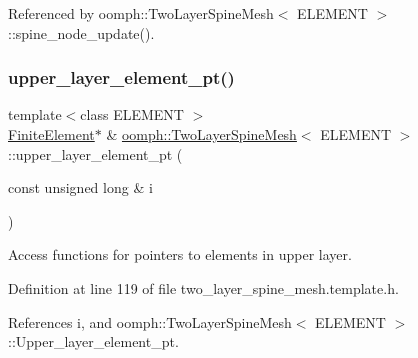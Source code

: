 Referenced by oomph\+::\+Two\+Layer\+Spine\+Mesh$<$ E\+L\+E\+M\+E\+N\+T $>$\+::spine\+\_\+node\+\_\+update().

\mbox{\label{classoomph_1_1TwoLayerSpineMesh_a36680574d0c8f023206ce8ffe1a99b06}} 
\subsubsection{\texorpdfstring{upper\+\_\+layer\+\_\+element\+\_\+pt()}{upper\_layer\_element\_pt()}}
{\footnotesize\ttfamily template$<$class E\+L\+E\+M\+E\+NT $>$ \\
\hyperlink{classoomph_1_1FiniteElement}{Finite\+Element}$\ast$ \& \hyperlink{classoomph_1_1TwoLayerSpineMesh}{oomph\+::\+Two\+Layer\+Spine\+Mesh}$<$ E\+L\+E\+M\+E\+NT $>$\+::upper\+\_\+layer\+\_\+element\+\_\+pt (\begin{DoxyParamCaption}\item[{const unsigned long \&}]{i }\end{DoxyParamCaption})\hspace{0.3cm}{\ttfamily [inline]}}



Access functions for pointers to elements in upper layer. 



Definition at line 119 of file two\+\_\+layer\+\_\+spine\+\_\+mesh.\+template.\+h.



References i, and oomph\+::\+Two\+Layer\+Spine\+Mesh$<$ E\+L\+E\+M\+E\+N\+T $>$\+::\+Upper\+\_\+layer\+\_\+element\+\_\+pt.

\mbox{\label{classoomph_1_1TwoLayerSpineMesh_a5fd9eae27ba19788e0b397936f0c5ead}} 
